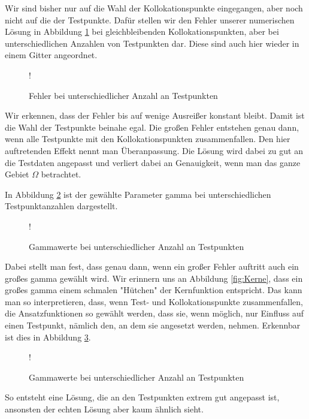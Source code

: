 Wir sind bisher nur auf die Wahl der Kollokationspunkte eingegangen, aber noch nicht auf die der Testpunkte. Dafür stellen wir den Fehler unserer numerischen Lösung in Abbildung \ref{fig:testpunkte} bei gleichbleibenden Kollokationspunkten, aber bei unterschiedlichen Anzahlen von Testpunkten dar. Diese sind auch hier wieder in einem Gitter angeordnet.
\begin{figure}[H]
\centering
\resizebox {\columnwidth} {!} {

}
\caption{Fehler bei unterschiedlicher Anzahl an Testpunkten}
\label{fig:testpunkte}
\end{figure}
Wir erkennen, dass der Fehler bis auf wenige Ausreißer konstant bleibt. Damit ist die Wahl der Testpunkte beinahe egal. Die großen Fehler entstehen genau dann, wenn alle Testpunkte mit den Kollokationspunkten zusammenfallen. Den hier auftretenden Effekt nennt man Überanpassung. Die Lösung wird dabei zu gut an die Testdaten angepasst und verliert dabei an Genauigkeit, wenn man das ganze Gebiet $\Omega$ betrachtet. 

In Abbildung \ref{fig:testpunkte-gamma} ist der gewählte Parameter gamma bei unterschiedlichen Testpunktanzahlen dargestellt.
\begin{figure}[ht]
\centering
\resizebox {\columnwidth} {!} {

}
\caption{Gammawerte bei unterschiedlicher Anzahl an Testpunkten}
\label{fig:testpunkte-gamma}
\end{figure}
Dabei stellt man fest, dass genau dann, wenn ein großer Fehler auftritt auch ein großes gamma gewählt wird. Wir erinnern uns an Abbildung \ref{fig:Kerne}, dass ein großes gamma einem schmalen "Hütchen"  der Kernfunktion entspricht. Das kann man so interpretieren, dass, wenn Test- und Kollokationspunkte zusammenfallen, die Ansatzfunktionen so gewählt werden, dass sie, wenn möglich, nur Einfluss auf einen Testpunkt, nämlich den, an dem sie angesetzt werden, nehmen. Erkennbar ist dies in Abbildung \ref{fig:overfitting}.
\begin{figure}[ht]
\centering
\resizebox {\columnwidth} {!} {

}
\caption{Gammawerte bei unterschiedlicher Anzahl an Testpunkten}
\label{fig:overfitting}
\end{figure}

So entsteht eine Lösung, die an den Testpunkten extrem gut angepasst ist, ansonsten der echten Lösung aber kaum ähnlich sieht.
